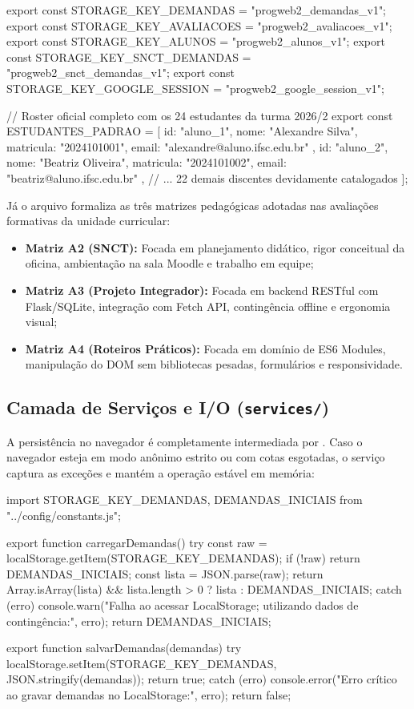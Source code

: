 \begin{boxCodigoJS}
export const STORAGE_KEY_DEMANDAS = "progweb2_demandas_v1";
export const STORAGE_KEY_AVALIACOES = "progweb2_avaliacoes_v1";
export const STORAGE_KEY_ALUNOS = "progweb2_alunos_v1";
export const STORAGE_KEY_SNCT_DEMANDAS = "progweb2_snct_demandas_v1";
export const STORAGE_KEY_GOOGLE_SESSION = "progweb2_google_session_v1";

// Roster oficial completo com os 24 estudantes da turma 2026/2
export const ESTUDANTES_PADRAO = [
  { id: "aluno_1", nome: "Alexandre Silva", matricula: "2024101001", email: "alexandre@aluno.ifsc.edu.br" },
  { id: "aluno_2", nome: "Beatriz Oliveira", matricula: "2024101002", email: "beatriz@aluno.ifsc.edu.br" },
  // ... 22 demais discentes devidamente catalogados
];
\end{boxCodigoJS}

Já o arquivo  formaliza as três matrizes pedagógicas adotadas nas avaliações formativas da unidade curricular:
\begin{itemize}
  \item \textbf{Matriz A2 (SNCT):} Focada em planejamento didático, rigor conceitual da oficina, ambientação na sala Moodle e trabalho em equipe;
  \item \textbf{Matriz A3 (Projeto Integrador):} Focada em backend RESTful com Flask/SQLite, integração com Fetch API, contingência offline e ergonomia visual;
  \item \textbf{Matriz A4 (Roteiros Práticos):} Focada em domínio de ES6 Modules, manipulação do DOM sem bibliotecas pesadas, formulários e responsividade.
\end{itemize}

\subsection{Camada de Serviços e I/O (\texttt{services/})}

A persistência no navegador é completamente intermediada por . Caso o navegador esteja em modo anônimo estrito ou com cotas esgotadas, o serviço captura as exceções e mantém a operação estável em memória:

\begin{boxCodigoJS}
import { STORAGE_KEY_DEMANDAS, DEMANDAS_INICIAIS } from "../config/constants.js";

export function carregarDemandas() {
  try {
    const raw = localStorage.getItem(STORAGE_KEY_DEMANDAS);
    if (!raw) return DEMANDAS_INICIAIS;
    const lista = JSON.parse(raw);
    return Array.isArray(lista) && lista.length > 0 ? lista : DEMANDAS_INICIAIS;
  } catch (erro) {
    console.warn("Falha ao acessar LocalStorage; utilizando dados de contingência:", erro);
    return DEMANDAS_INICIAIS;
  }
}

export function salvarDemandas(demandas) {
  try {
    localStorage.setItem(STORAGE_KEY_DEMANDAS, JSON.stringify(demandas));
    return true;
  } catch (erro) {
    console.error("Erro crítico ao gravar demandas no LocalStorage:", erro);
    return false;
  }
}
\end{boxCodigoJS}

